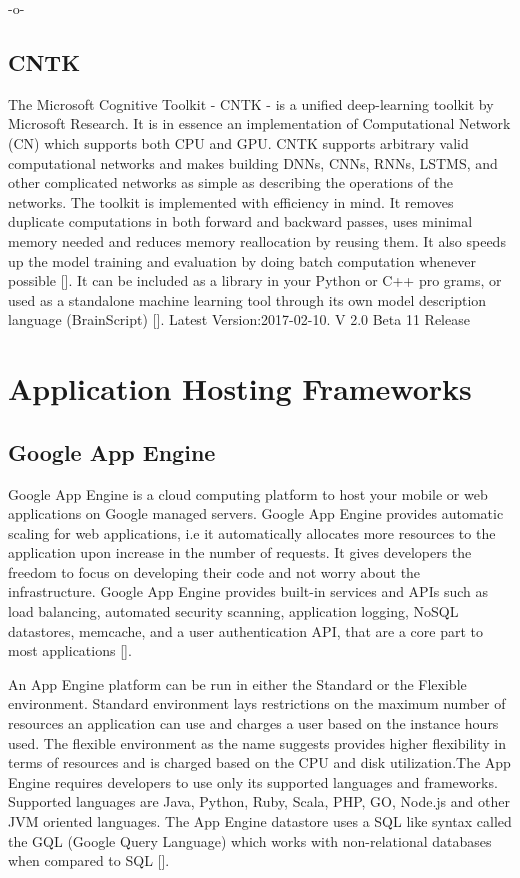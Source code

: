     -o-
    
\subsection{CNTK}

The Microsoft Cognitive Toolkit - CNTK - is a unified deep-learning
toolkit by Microsoft Research. It is in essence an implementation of
Computational Network (CN) which supports both CPU and GPU. CNTK
supports arbitrary valid computational networks and makes building
DNNs, CNNs, RNNs, LSTMS, and other complicated networks as simple as
describing the operations of the networks.  The toolkit is implemented
with efficiency in mind. It removes duplicate computations in both
forward and backward passes, uses minimal memory needed and reduces
memory reallocation by reusing them. It also speeds up the model
training and evaluation by doing batch computation whenever
possible [\cite{book-cntk}]. It can be included as a library in your
Python or C++ pro grams, or used as a standalone machine learning tool
through its own model description language
(BrainScript) [\cite{www-cntk}]. Latest Version:2017-02-10. V 2.0 Beta
11 Release


\section{Application Hosting Frameworks}

\subsection{Google App Engine}

Google App Engine is a cloud computing platform to host your mobile or
web applications on Google managed servers. Google App Engine provides
automatic scaling for web applications, i.e it automatically allocates
more resources to the application upon increase in the number of
requests. It gives developers the freedom to focus on developing their
code and not worry about the infrastructure. Google App Engine
provides built-in services and APIs such as load balancing, automated
security scanning, application logging, NoSQL datastores, memcache,
and a user authentication API, that are a core part to most
applications [\cite{www-appengine-google}].
     
An App Engine platform can be run in either the Standard or the
Flexible environment. Standard environment lays restrictions on the
maximum number of resources an application can use and charges a user
based on the instance hours used. The flexible environment as the name
suggests provides higher flexibility in terms of resources and is
charged based on the CPU and disk utilization.The App Engine requires
developers to use only its supported languages and
frameworks. Supported languages are Java, Python, Ruby, Scala, PHP,
GO, Node.js and other JVM oriented languages. The App Engine datastore
uses a SQL like syntax called the GQL (Google Query Language) which
works with non-relational databases when compared to
SQL [\cite{www-wiki-appengine}].
    
